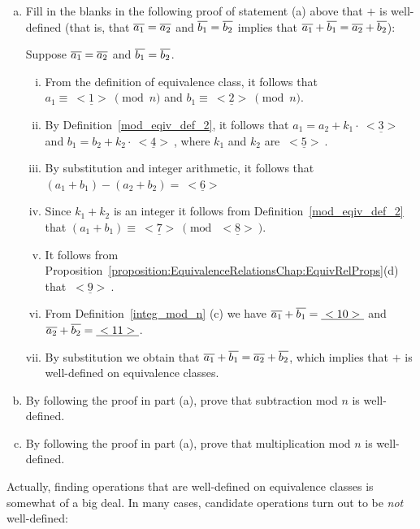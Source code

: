 \begin{exercise}{54} 
\begin{enumerate}[(a)]
\item 
Fill in the blanks in the following proof of statement (a) above that $\mathbin{+}$ is well-defined (that is, that  $\overline{a_1} = \overline{a_2}$ and $\overline{b_1} = \overline{b_2}$ implies that $\overline{a_1} + \overline{b_1} = \overline{a_2} + \overline{b_2}$):

Suppose $\overline{a_1} = \overline{a_2}$ and $\overline{b_1} = \overline{b_2}$. 
\begin{enumerate}[(i)]
\item
From the definition of equivalence class, it follows that  $a_1 \equiv \underline{~<1>~} \pmod{n}$ and $b_1 \equiv \underline{~<2>~} \pmod{n}$. 
\item  
By Definition~\ref{mod_eqiv_def_2}, it follows that 
$a_1  = a_2 + k_1 \cdot \underline{~<3>~}$ and $b_1  = b_2 + k_2 \cdot \underline{~<4>~}$, where $k_1$ and $k_2$ are $\underline{~<5>~}$. 
\item
By substitution and integer arithmetic,  it follows that $(a_1 + b_1) - (a_2 + b_2) =  \underline{~<6>~}$
\item
Since $k_1 + k_2$ is an integer it follows from Definition~\ref{mod_eqiv_def_2} that $(a_1 + b_1) \equiv \underline{~<7>~} \pmod{\underline{~<8>~}}$.
\item 
It follows from Proposition~\ref{proposition:EquivalenceRelationsChap:EquivRelProps}(d) that $\underline{~<9>~}$.
\item
From Definition~\ref{integ_mod_n} (c) we have $\overline{a_1} \mathbin{+} \overline{b_1} =  \underline{~<10>~}$ and $\overline{a_2} \mathbin{+} \overline{b_2} =  \underline{~<11>~}$.
\item
By substitution we obtain that $\overline{a_1} + \overline{b_1} = \overline{a_2} + \overline{b_2}$, which implies that  $\mathbin{+}$ is well-defined on equivalence classes.
\end{enumerate}
\item By following the proof in part (a), prove that subtraction mod $n$ is well-defined.
\item By following the proof in part (a), prove that multiplication mod $n$ is well-defined.
\end{enumerate}
\end{exercise}

Actually, finding operations that are well-defined on equivalence classes is somewhat of a big deal. In many cases, candidate operations turn out to be \emph{not} well-defined:

